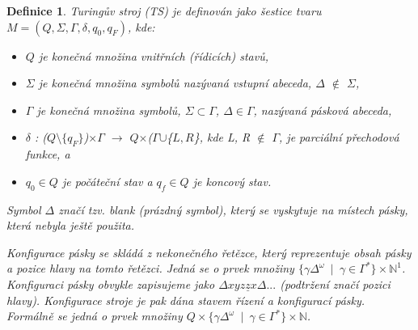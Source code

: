 \documentclass[11pt, twocolumn]{article}
\newtheorem{theorem}{Definice}
\begin{document}
\begin{theorem}
\label{def_1}
\emph{
Turingův stroj \emph{(TS)} \emph{je definován jako šestice
tvaru} \(M =(Q, \Sigma, \Gamma, \delta, q_0, q_F)\),\emph{ kde:}}
\begin{itemize}
\setlength\itemsep{0.05em}
\item \emph{\(Q\)\emph{ je konečná množina} vnitřních (řídicích) stavů,}
\item \emph{\(\Sigma\) \emph{je konečná množina symbolů nazývaná} vstupní
abeceda, \(\Delta\) \(\notin\) \(\Sigma\),}
\item \emph{\(\Gamma\) \emph{je konečná množina symbolů, \(\Sigma\subset\Gamma\), \(\Delta\in\Gamma\),
nazývaná} pásková abeceda,}
\item \emph{\(\delta\) : (\(Q\setminus\{q_F\}\))\(\times\)\(\Gamma\) \(\rightarrow\) \(Q\)\(\times\)(\(\Gamma\)\(\cup\)\{\(L, R\)\}, \emph{kde L, R \(\notin\) \(\Gamma\), je parciální} přechodová funkce, \emph{a}}
\item \emph{\(q_0 \in Q\) \emph{je} počáteční stav \emph{a} \(q_f \in Q\) \emph{je} koncový stav.}
\end{itemize}

\emph{Symbol \(\Delta\) značí tzv. \emph{blank} (prázdný symbol), který se vyskytuje na místech pásky, která nebyla ještě použita.}

\emph{
\emph{Konfigurace pásky} se skládá z nekonečného řetězce,
který reprezentuje obsah pásky a pozice hlavy na tomto
řetězci. Jedná se o prvek množiny
\mbox{\(\{\gamma \Delta^{\omega}\)
\(|\)
\(\gamma \in \Gamma^{*}\}\times\mathbb{N}^{1}\)}.
\emph{Konfiguraci pásky} obvykle zapisujeme jako \(\Delta xyz\underline{z}x\Delta...\)
(podtržení značí pozici hlavy). \emph{Konfigurace stroje} je pak
dána stavem řízení a konfigurací pásky. Formálně se jedná
o prvek množiny \mbox{\(Q\times\{\gamma \Delta^{\omega}\) \(|\) \(\gamma \in \Gamma^{*}\}\times\mathbb{N}\)}.
}
\end{theorem}
\end{document}
